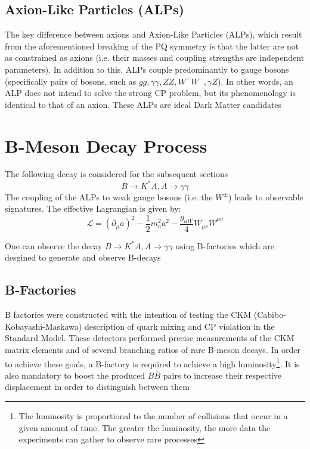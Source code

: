 \documentclass{article}
\begin{document}
\subsection{Axion-Like Particles (ALPs)}
The key difference between axions and Axion-Like Particles (ALPs), which result from the aforementioned breaking of the PQ symmetry is that the latter are not as constrained as axions (i.e. their masses and coupling strengths are independent parameters). 
In addition to this, ALPs couple predominantly to gauge bosons (specifically pairs of bosons, such as $gg, \gamma\gamma, ZZ, W^{+}W^{-}, \gamma Z$). In other words, an ALP does not intend to solve the strong CP problem, but its phenomenology is identical to that of an axion. These ALPs are ideal Dark Matter candidates


\section{B-Meson Decay Process}
The following decay is considered for the subsequent sections
\begin{equation}
    B\rightarrow K^{*}A, A\rightarrow\gamma\gamma
\end{equation}
The coupling of the ALPs to weak gauge bosons (i.e. the $W^{\pm}$) leads to observable signatures. The effective Lagrangian is given by:
\begin{equation}
    \mathcal{L} = (\partial_{\mu}a)^{2}-\frac{1}{2}m_{a}^{2}a^{2}-\frac{g_{aW}}{4}W_{\mu\nu}\bar{W}^{\mu\nu}
\end{equation}


One can observe the decay $B\rightarrow K^{*}A, A\rightarrow\gamma\gamma$ using B-factories which are desgined to generate and observe B-decays

\subsection{B-Factories}
B factories were constructed with the intention of testing the CKM (Cabibo-Kobayashi-Maskawa) description of quark mixing and CP violation in the Standard Model. These detectors performed precise measurements of the CKM matrix elements and of several branching ratios of rare B-meson decays. In order to achieve these goals, a B-factory 
is required to achieve a high luminosity\footnote{The luminosity is proportional to the number of collisions that occur in a given amount of time. The greater the luminosity, the more data the experiments can gather to observe rare processes}. It is also mandatory to boost the produced $B\bar{B}$ pairs to increase their respective displacement 
in order to distinguish between them
\end{document}
